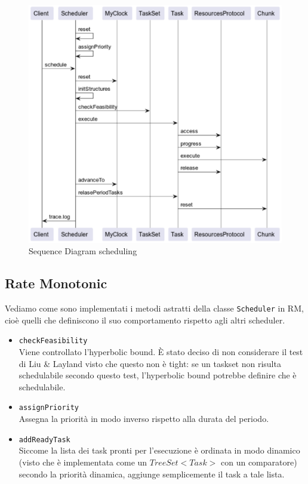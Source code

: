 \begin{figure}[htbp]
    \centering
    \includegraphics[width=.75\textwidth]{immagini/sequence diagram.pdf}
    \caption{Sequence Diagram scheduling}
    \label{fig:sequenceDiagram}
\end{figure}

\subsection{Rate Monotonic}
Vediamo come sono implementati i metodi astratti della classe \texttt{Scheduler} in RM, cioè quelli che definiscono il suo comportamento rispetto agli altri scheduler.
\begin{itemize}
    \item \texttt{checkFeasibility} \\
        Viene controllato l'hyperbolic bound. È stato deciso di non considerare il test di Liu \& Layland visto che questo non è tight: se un taskset non risulta schedulabile secondo questo test, l'hyperbolic bound potrebbe definire che è schedulabile.
    \item \texttt{assignPriority} \\
        Assegna la priorità in modo inverso rispetto alla durata del periodo.
    \item \texttt{addReadyTask} \\
        Siccome la lista dei task pronti per l'esecuzione è ordinata in modo dinamico (visto che è implementata come un $TreeSet<Task>$ con un comparatore) secondo la priorità dinamica, aggiunge semplicemente il task a tale lista.
\end{itemize}

